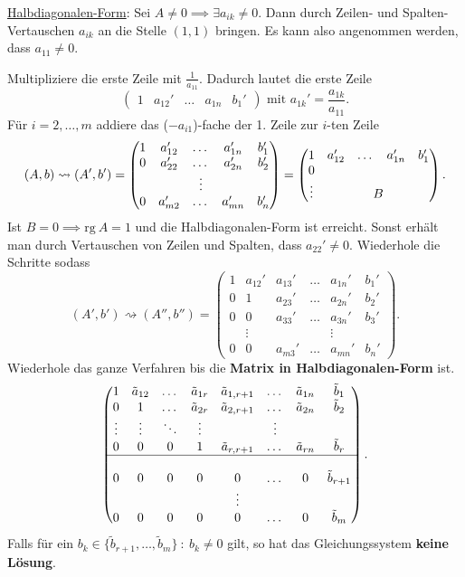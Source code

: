 \underline{Halbdiagonalen-Form}: Sei $A\neq0 \implies \exists a_{ik} \neq 0$.
Dann durch Zeilen- und Spalten-Vertauschen $a_{ik}$ an die Stelle $(1,1)$ 
bringen. Es kann also angenommen werden, dass $a_{11} \neq 0$. 

Multipliziere die erste Zeile mit $\displaystyle\frac{1}{a_{11}}$. 
Dadurch lautet die erste Zeile
\[
    \begin{pmatrix}
        1 & a_{12}' & \dots & a_{1n} & b_{1}'
    \end{pmatrix}
    \text{ mit }
    a_{1k}' = \frac{a_{1k}}{a_{11}}
.\]
Für $i=2,\dots, m$ addiere das ($-a_{i1}$)-fache der 1. Zeile zur $i$-ten
Zeile
\[
    (A,b) \rightsquigarrow (A', b')=\begin{pmatrix}
        1 & a_{12}' & \dots & a_{1n}' & b_1'\\
        0 & a_{22}' & \dots & a_{2n}' & b_2'\\
        &&\vdots\\
        0 & a_{m2}' & \dots & a_{mn}' & b_n'
    \end{pmatrix} = \begin{pmatrix}
        1 & a_{12}' & \dots & a_{1n}' & b_1'\\
        0\\
        \vdots & \multicolumn{4}{c}{B} 
    \end{pmatrix}
.\]
Ist $B=0\implies \mathrm{rg}\ A=1$ und die Halbdiagonalen-Form ist erreicht.
Sonst erhält man durch Vertauschen von Zeilen und Spalten, dass $a_{22}'\neq 0$.
Wiederhole die Schritte sodass
\[
    (A', b') \rightsquigarrow (A'',b'') = \begin{pmatrix}
        1 & a_{12}' & a_{13}' & \dots & a_{1n}' & b_1'\\
        0 & 1 & a_{23}' & \dots & a_{2n}' & b_2'\\
        0 & 0 & a_{33}' & \dots & a_{3n}' & b_3'\\
        &\vdots&&&\vdots\\
        0 & 0 & a_{m3}' & \dots & a_{mn}' & b_n'
    \end{pmatrix}     
.\]
Wiederhole das ganze Verfahren bis die \textbf{Matrix in Halbdiagonalen-Form} ist.
\[
    \begin{pmatrix}
        1 & \tilde{a}_{12} & \dots & \tilde{a}_{1r} & \tilde{a}_{1,r+1} & \dots & \tilde{a}_{1n} & \tilde{b}_1\\
        0 & 1 & \dots & \tilde{a}_{2r} & \tilde{a}_{2,r+1} & \dots & \tilde{a}_{2n} & \tilde{b}_2\\
        \vdots & \vdots & \ddots & \vdots  & & \vdots\\
        0 & 0 & 0 & 1 & \tilde{a}_{r,r+1} & \dots & \tilde{a}_{rn} & \tilde{b}_r\\
        \hline\\
        0 & 0 & 0 & 0 & 0 & \dots & 0 & \tilde{b}_{r+1}\\
        &&&& \vdots\\
        0 & 0 & 0 & 0 & 0 & \dots & 0 & \tilde{b}_{m}
    \end{pmatrix}    
.\]
Falls für ein $b_k \in \{\tilde{b}_{r+1}, \dots, \tilde{b}_{m}\}\ :\ b_k \neq 0$ gilt,
so hat das Gleichungssystem \textbf{keine Lösung}.


